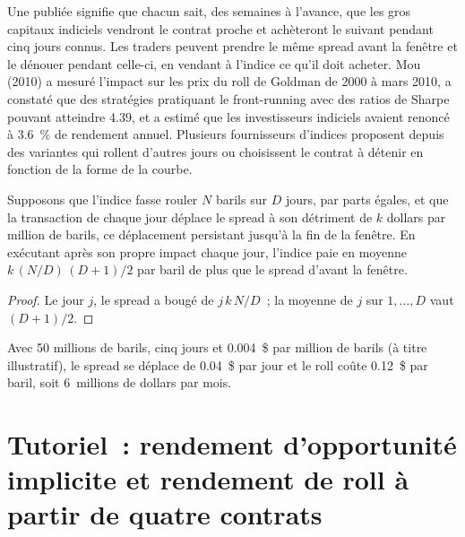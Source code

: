 Une  publiée signifie que chacun sait, des semaines à l'avance, que les gros capitaux indiciels vendront le contrat
proche et achèteront le suivant pendant cinq jours connus. Les traders peuvent prendre le même spread avant la fenêtre et le
dénouer pendant celle-ci, en vendant à l'indice ce qu'il doit acheter. Mou (2010) a mesuré l'impact sur les prix du roll de Goldman
de 2000 à mars 2010, a constaté que des stratégies pratiquant le front-running avec des ratios de Sharpe pouvant atteindre
4.39, et a estimé que les investisseurs indiciels avaient renoncé à 3.6~\% de rendement annuel. Plusieurs fournisseurs d'indices
proposent depuis des variantes qui rollent d'autres jours ou choisissent le contrat à détenir en fonction de la forme de la courbe.

\begin{proposition}\label{prop:m3:forward-curves-storage-and-convenience-yield:rollcost}
Supposons que l'indice fasse rouler $N$ barils sur $D$ jours, par parts égales, et que la transaction de chaque jour déplace le spread
à son détriment de $k$ dollars par million de barils, ce déplacement persistant jusqu'à la fin de la fenêtre. En exécutant
après son propre impact chaque jour, l'indice paie en moyenne $k\,(N/D)\,(D + 1)/2$ par baril de plus que le spread
d'avant la fenêtre.
\end{proposition}

\begin{proof}
Le jour $j$, le spread a bougé de $j\,k\,N/D$~; la moyenne de $j$ sur $1,\dots,D$ vaut $(D + 1)/2$.
\end{proof}

Avec 50 millions de barils, cinq jours et 0.004~\$ par million de barils (à titre illustratif), le spread se déplace
de 0.04~\$ par jour et le roll coûte 0.12~\$ par baril, soit 6~millions de dollars par mois.

\section{Tutoriel~: rendement d'opportunité implicite et rendement de roll à partir de quatre contrats}\label{tut:m3:forward-curves-storage-and-convenience-yield:roll}

